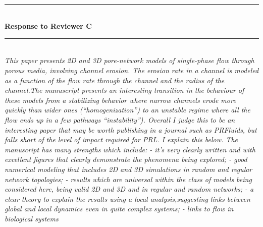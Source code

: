 \documentclass{article}
\newcommand{\Hline}{\rule{\linewidth}{.1mm}}
\newcommand{\Question}[1]{\noindent \color{black}\emph{#1}\normalcolor}
\newcommand{\Answer}[1]{\noindent {\color{blue}{ #1}}\normalcolor}
\newcommand{\AnswerQ}[1]{\noindent {\footnotesize {\color{blue}{ #1}}}\normalcolor}
\def\p{\textit{p.~}}
\begin{document}
\Answer{From \p4 of the main text:}
%

\AnswerQ{\begin{quote}
    ``Since series connections are always moving toward homogenization, while parallel connections show a phase transition, we expect the phase transition to be at approximately $n\approx 3$, governed by the parallel connections. This observation  is consistent with the numerical simulation results shown in Figs.~2 and 3a (for $m=1$) as well as for additional values of $m$ (Fig.~4). Note, however, that the local dynamics model is only approximate and the numerically observed value of the phase transition happens for a value slightly larger than $n=3$ in Fig.~3.''
\end{quote}}
\\


\newpage 
\vspace{10 mm}
\noindent
\Hline \\
\textbf{Response to Reviewer C} \\
\Hline
\\

\Question{This paper presents 2D and 3D pore-network models of single-phase flow through porous media, involving channel erosion. The erosion rate in a channel is modeled as a function of the flow rate through the channel and the radius of the channel.The manuscript presents an interesting transition in the behaviour of these models from a stabilizing behavior where narrow channels erode more quickly than wider ones (``homogenization'') to an unstable regime where all the flow ends up in a few pathways ``instability''). Overall I judge this to be an interesting paper that may be worth publishing in a journal such as PRFluids, but falls short of the level of impact required for PRL. I explain this below.  The manuscript has many strengths which include: - it's very clearly written and with excellent figures that clearly demonstrate the phenomena being explored; - good numerical modeling that includes 2D and 3D simulations in random and regular network topologies; - results which are universal within the class of models being considered here, being valid 2D and 3D and in regular and random networks; - a clear theory to explain the results using a local analysis,suggesting links between global and local dynamics even in quite complex systems; - links to flow in biological systems
\newline}
\end{document}
